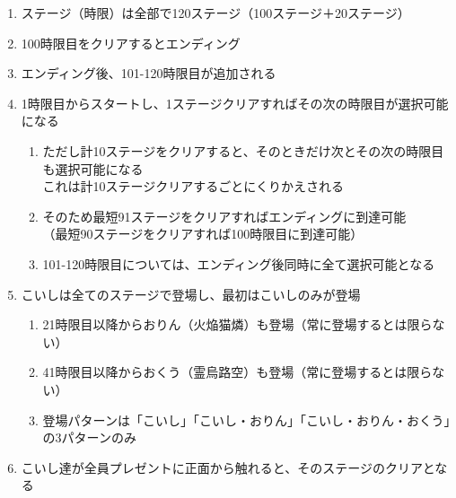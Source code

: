 \clearpage
\begin{enumerate}[label={\sarrow}]
\item ステージ（時限）は全部で120ステージ（100ステージ＋20ステージ）
\item 100時限目をクリアするとエンディング
\item エンディング後、101-120時限目が追加される
\item 1時限目からスタートし、1ステージクリアすればその次の時限目が選択可能になる
  \begin{enumerate}[label={\sarrow}]
  \item ただし計10ステージをクリアすると、そのときだけ次とその次の時限目も選択可能になる\\
        これは計10ステージクリアするごとにくりかえされる
  \item そのため最短91ステージをクリアすればエンディングに到達可能\\
        （最短90ステージをクリアすれば100時限目に到達可能）
  \item 101-120時限目については、エンディング後同時に全て選択可能となる
  \end{enumerate}
\item こいしは全てのステージで登場し、最初はこいしのみが登場
  \begin{enumerate}[label={\sarrow}]
  \item 21時限目以降からおりん（火焔猫燐）も登場（常に登場するとは限らない）
  \item 41時限目以降からおくう（霊烏路空）も登場（常に登場するとは限らない）
  \item 登場パターンは「こいし」「こいし・おりん」「こいし・おりん・おくう」の3パターンのみ
  \end{enumerate}
\item こいし達が全員プレゼントに正面から触れると、そのステージのクリアとなる
\end{enumerate}





